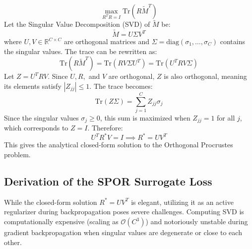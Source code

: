 \documentclass{article}
\theoremstyle{plain}
\theoremstyle{definition}
\theoremstyle{remark}
\begin{document}
\begin{equation}
    \max_{R^T R = I} \text{Tr}( R \tilde{M}^T )
\end{equation}
Let the Singular Value Decomposition (SVD) of $\tilde{M}$ be:
\begin{equation}
    \tilde{M} = U \Sigma V^T
\end{equation}
where $U, V \in \mathbb{R}^{C \times C}$ are orthogonal matrices and $\Sigma = \text{diag}(\sigma_1, \dots, \sigma_C)$ contains the singular values. The trace can be rewritten as:
\begin{equation}
    \text{Tr}( R \tilde{M}^T ) = \text{Tr}( R V \Sigma U^T ) = \text{Tr}( U^T R V \Sigma )
\end{equation}
Let $Z = U^T R V$. Since $U, R,$ and $V$ are orthogonal, $Z$ is also orthogonal, meaning its elements satisfy $|Z_{jj}| \le 1$. The trace becomes:
\begin{equation}
    \text{Tr}( Z \Sigma ) = \sum_{j=1}^C Z_{jj} \sigma_j
\end{equation}
Since the singular values $\sigma_j \ge 0$, this sum is maximized when $Z_{jj} = 1$ for all $j$, which corresponds to $Z = I$. Therefore:
\begin{equation}
    U^T R^* V = I \implies R^* = U V^T
\end{equation}
This gives the analytical closed-form solution to the Orthogonal Procrustes problem.

\subsection{Derivation of the SPOR Surrogate Loss}
While the closed-form solution $R^* = U V^T$ is elegant, utilizing it as an active regularizer during backpropagation poses severe challenges. Computing SVD is computationally expensive (scaling as $\mathcal{O}(C^3)$) and notoriously unstable during gradient backpropagation when singular values are degenerate or close to each other.
\end{document}

